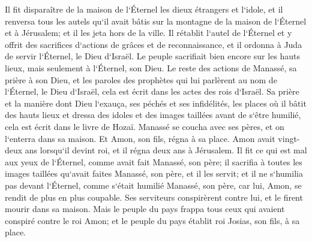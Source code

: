 \verse Il fit disparaître de la maison de l`Éternel les dieux étrangers et l`idole, et il renversa tous les autels qu`il avait bâtis sur la montagne de la maison de l`Éternel et à Jérusalem; et il les jeta hors de la ville. 
\verse Il rétablit l`autel de l`Éternel et y offrit des sacrifices d`actions de grâces et de reconnaissance, et il ordonna à Juda de servir l`Éternel, le Dieu d`Israël. 
\verse Le peuple sacrifiait bien encore sur les hauts lieux, mais seulement à l`Éternel, son Dieu. 
\verse Le reste des actions de Manassé, sa prière à son Dieu, et les paroles des prophètes qui lui parlèrent au nom de l`Éternel, le Dieu d`Israël, cela est écrit dans les actes des rois d`Israël. 
\verse Sa prière et la manière dont Dieu l`exauça, ses péchés et ses infidélités, les places où il bâtit des hauts lieux et dressa des idoles et des images taillées avant de s`être humilié, cela est écrit dans le livre de Hozaï. 
\verse Manassé se coucha avec ses pères, et on l`enterra dans sa maison. Et Amon, son fils, régna à sa place. 
\verse Amon avait vingt-deux ans lorsqu`il devint roi, et il régna deux ans à Jérusalem. 
\verse Il fit ce qui est mal aux yeux de l`Éternel, comme avait fait Manassé, son père; il sacrifia à toutes les images taillées qu`avait faites Manassé, son père, et il les servit; 
\verse et il ne s`humilia pas devant l`Éternel, comme s`était humilié Manassé, son père, car lui, Amon, se rendit de plus en plus coupable. 
\verse Ses serviteurs conspirèrent contre lui, et le firent mourir dans sa maison. 
\verse Mais le peuple du pays frappa tous ceux qui avaient conspiré contre le roi Amon; et le peuple du pays établit roi Josias, son fils, à sa place. 

